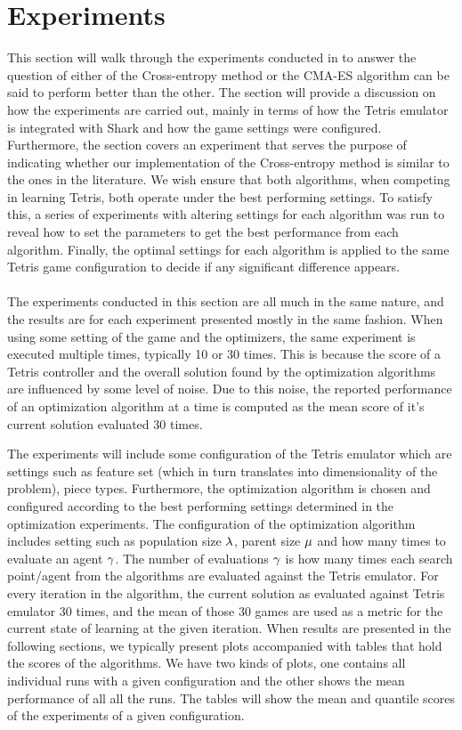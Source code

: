 \section{Experiments}


This section will walk through the experiments conducted in to answer the question 
of either of the Cross-entropy method or the CMA-ES algorithm can be said to perform better
than the other. The section will provide a discussion on how the experiments are carried out, mainly
in terms of how the Tetris emulator is integrated with Shark and how the game settings were configured.
Furthermore, the section covers an experiment that serves the purpose of indicating whether our implementation
of the Cross-entropy method is similar to the ones in the literature. 
We wish ensure that both algorithms, when competing in learning Tetris, both operate under the 
best performing settings. To satisfy this, a series of experiments with altering settings for each 
algorithm was run to reveal how to set the parameters to get the best performance from 
each algorithm. Finally, the optimal settings for each algorithm is applied to
the same Tetris game configuration to decide if any significant difference appears.\\
\\
The experiments conducted in this section are all much in the same nature, and the 
results are for each experiment presented mostly in the same fashion. When using some setting 
of the game and the optimizers, the same experiment is executed multiple times, typically 
10 or 30 times. This is because the score of a Tetris controller and the overall 
solution found by the optimization algorithms are influenced by some level of noise.
Due to this noise, the reported performance of an optimization algorithm at a time
is computed as the mean score of it's current solution evaluated 30 times.
\begin{changebar}
The experiments will include some configuration of the Tetris emulator which are settings
such as feature set (which in turn translates into dimensionality of the problem),
piece types. Furthermore, the optimization algorithm is chosen and configured according to
the best performing settings determined in the optimization experiments. The
configuration of the optimization algorithm includes setting such as population size
$\lambda$, parent size $\mu$ and how many times
to evaluate an agent $\gamma$. The number of evaluations $\gamma$
is how many times each search point/agent from the algorithms are evaluated against the 
Tetris emulator. For every iteration in the algorithm, the current solution as 
evaluated against Tetris emulator 30 times, and the mean of those 30 games are used as
a metric for the current state of learning at the given iteration. When results are presented 
in the following sections, we typically present plots accompanied with tables 
that hold the scores of the algorithms. We have two kinds of plots, one contains all
individual runs with a given configuration and the other shows the mean performance
of all all the runs. The tables will show the mean and quantile scores of the experiments
of a given configuration.\end{changebar}\\
